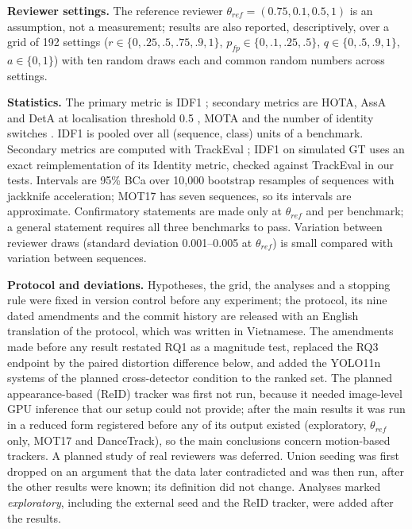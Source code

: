 \documentclass[final,times,twocolumn]{elsarticle}
\begin{document}
\textbf{Reviewer settings.} The reference reviewer $\theta_{ref} = (0.75, 0.1, 0.5, 1)$ is an assumption,
not a measurement; results are also reported, descriptively, over a grid of 192 settings
($r \in \{0, .25, .5, .75, .9, 1\}$, $p_{fp} \in \{0, .1, .25, .5\}$, $q \in \{0, .5, .9, 1\}$,
$a \in \{0, 1\}$) with ten random draws each and common random numbers across settings.

\textbf{Statistics.} The primary metric is IDF1 \cite{ristani2016idf1}; secondary metrics are HOTA, AssA and
DetA at localisation threshold 0.5 \cite{luiten2021hota}, MOTA and the number of identity switches
\cite{bernardin2008clear}. IDF1 is pooled over all (sequence, class) units of a benchmark. Secondary metrics
are computed with TrackEval \cite{luiten2020trackeval}; IDF1 on simulated GT uses an exact reimplementation of
its Identity metric, checked against TrackEval in our tests. Intervals are 95\% BCa \cite{efron1987bca} over
10,000 bootstrap resamples of sequences with jackknife acceleration; MOT17 has seven sequences, so its
intervals are approximate. Confirmatory statements are made only at $\theta_{ref}$ and per benchmark; a
general statement requires all three benchmarks to pass. Variation between reviewer draws (standard
deviation 0.001--0.005 at $\theta_{ref}$) is small compared with variation between sequences.

\textbf{Protocol and deviations.} Hypotheses, the grid, the analyses and a stopping rule were fixed in
version control before any experiment; the protocol, its nine dated amendments and the commit history
are released with an English translation of the protocol, which was written in Vietnamese. The amendments
made before any result restated RQ1 as a magnitude test, replaced the RQ3 endpoint by the paired distortion
difference below, and added the YOLO11n systems of the planned cross-detector condition to the ranked set.
The planned appearance-based (ReID) tracker was first not run, because it needed image-level GPU inference
that our setup could not provide; after the main results it was run in a reduced form registered before any
of its output existed (exploratory, $\theta_{ref}$ only, MOT17 and DanceTrack), so the main conclusions
concern motion-based trackers. A planned study of real reviewers was deferred. Union seeding was
first dropped on an argument that the data later contradicted and was then run, after the other results
were known; its definition did not change. Analyses marked \emph{exploratory}, including the external seed
and the ReID tracker, were added after the results.
\end{document}
